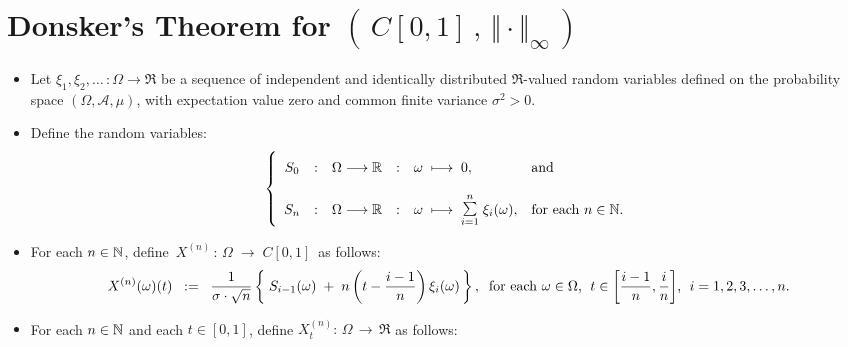 

\section{Donsker's Theorem for $\left(\,C[0,1]\,,\,\Vert\cdot\Vert_{\infty}\,\right)$}
\setcounter{theorem}{0}
\setcounter{equation}{0}

\renewcommand{\theenumi}{\roman{enumi}}
\renewcommand{\labelenumi}{\textnormal{(\theenumi)}$\;\;$}

\begin{proposition}
\mbox{}\vskip 0cm
\begin{itemize}
\item	Let $\xi_{1}, \xi_{2}, \ldots\, : \Omega \longrightarrow \Re$ be a sequence of
		independent and identically distributed $\Re$-valued random variables
		defined on the probability space $(\Omega,\mathcal{A},\mu)$,
		with expectation value zero and common finite variance $\sigma^{2} > 0$.
\item	Define the random variables:
		\begin{equation*}
		\left\{\begin{array}{ccccll}
		S_{0}
		&:&\overset{{\color{white}1}}{\Omega} \longrightarrow \Re
		&:& \omega \;\longmapsto\; 0,
		& \textnormal{and}
		\\ \\
		S_{n}
		&:&	\Omega \longrightarrow \Re
		&:&	\omega \;\longmapsto\; \overset{n}{\underset{i=1}{\textnormal{\Large$\sum$}}}\;\xi_{i}(\omega),
		& \textnormal{for each $n \in \N$}.
		\end{array}\right.
		\end{equation*}
\item	For each $n \in \mathbb{N}$, define \,$X^{(n)} \,:\, \Omega \;\longrightarrow\;C[0,1]$\, as follows:
		\begin{equation*}
		X^{(n)}(\omega)(t)
		\;\; := \;\;
		\dfrac{1}{\sigma\cdot\sqrt{n}}
		\left\{\;
		S_{i-1}(\omega) \;+\; n\left(t - \dfrac{i-1}{n}\right)\xi_{i}(\omega)
		\,\right\},
		\;\;
		\textnormal{for each $\omega \in \Omega$, \;$t \in \left[\frac{i-1}{n},\frac{i}{n}\right]$, \;$i = 1,2,3,\ldots,n$}.
		\end{equation*}
\item	For each $n \in \mathbb{N}$ and each $t \in [0,1]$, define
		\;$X^{(n)}_{t} : \,\Omega \, \longrightarrow \, \Re$\;
		as follows:
		\begin{equation*}

\end{equation*}
\end{itemize}
\end{proposition}
